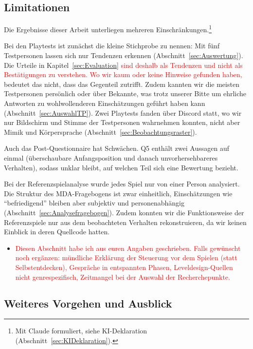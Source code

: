 \documentclass[../Main.tex]{subfiles}
\begin{document}
\subsection{Limitationen} \label{sec:Limitationen}

Die Ergebnisse dieser Arbeit unterliegen mehreren Einschränkungen.\footnote{Mit Claude formuliert, siehe KI-Deklaration (Abschnitt~\ref{sec:KIDeklaration}).}

Bei den Playtests ist zunächst die kleine Stichprobe zu nennen: Mit fünf Testpersonen lassen sich nur Tendenzen erkennen (Abschnitt~\ref{sec:Auswertung}). Die Urteile in Kapitel~\ref{sec:Evaluation} \textcolor{red}{sind deshalb als Tendenzen und nicht als Bestätigungen zu verstehen. Wo wir kaum oder keine Hinweise gefunden haben,} bedeutet das nicht, dass das Gegenteil zutrifft. Zudem kannten wir die meisten Testpersonen persönlich oder über Bekannte, was trotz unserer Bitte um ehrliche Antworten zu wohlwollenderen Einschätzungen geführt haben kann (Abschnitt~\ref{sec:AuswahlTP}). Zwei Playtests fanden über Discord statt, wo wir nur Bildschirm und Stimme der Testpersonen wahrnehmen konnten, nicht aber Mimik und Körpersprache (Abschnitt~\ref{sec:Beobachtungsraster}).

Auch das Post-Questionnaire hat Schwächen. Q5 enthält zwei Aussagen auf einmal (überschaubare Anfangsposition und danach unvorhersehbareres Verhalten), sodass unklar bleibt, auf welchen Teil sich eine Bewertung bezieht.

Bei der Referenzspielanalyse wurde jedes Spiel nur von einer Person analysiert. Die Struktur des MDA-Fragebogens ist zwar einheitlich, Einschätzungen wie \enquote{befriedigend} bleiben aber subjektiv und personenabhängig (Abschnitt~\ref{sec:Analysefragebogen}). Zudem konnten wir die Funktionsweise der Referenzspiele nur aus dem beobachteten Verhalten rekonstruieren, da wir keinen Einblick in deren Quellcode hatten.

\begin{itemize}[leftmargin=1.5cm]
    \item \textcolor{red}{Diesen Abschnitt habe ich aus euren Angaben geschrieben. Falls gewünscht noch ergänzen: mündliche Erklärung der Steuerung vor dem Spielen (statt Selbstentdecken), Gespräche in entspannten Phasen, Leveldesign-Quellen nicht genrespezifisch, Zeitmangel bei der Auswahl der Recherchepunkte.}
\end{itemize}

\subsection{Weiteres Vorgehen und Ausblick} \label{sec:Verbesserungen}
\end{document}
